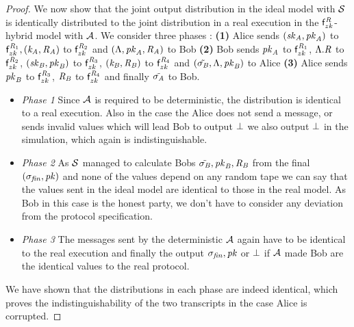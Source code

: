 \begin{proof}
    We now show that the joint output distribution in the ideal model with $\mathcal{S}$ is identically distributed to the joint distribution in a real execution in the $\mathsf{f}^{\mathit{R}}_{zk}$-hybrid model with $\mathcal{A}$.
    We consider three phases :
    \textbf{(1)} Alice sends $(\mathit{sk}_{\mathit{A}}, \mathit{pk}_{\mathit{A}})$ to $\mathsf{f}^{\mathit{R}_1}_{zk}, (\mathit{\mathit{k}_{\mathit{A}}}, \mathit{R}_{\mathit{A}})$ to $\mathsf{f}^{\mathit{R}_2}_{zk}$ and $(\Lambda, \mathit{pk}_{\mathit{A}}, \mathit{R}_{\mathit{A}})$ to Bob
    \textbf{(2)} Bob sends $\mathit{pk}_{\mathit{A}}$ to $\mathsf{f}^{\mathit{R}_1}_{zk}$, $\Lambda.\mathit{R}$ to $\mathsf{f}^{\mathit{R}_2}_{zk}$, $(\mathit{sk}_{\mathit{B}}, \mathit{pk}_{\mathit{B}})$ to $\mathsf{f}^{\mathit{R}_3}_{zk}$, $(\mathit{\mathit{k}_{\mathit{B}}}, \mathit{R}_{\mathit{B}})$ to $\mathsf{f}^{\mathit{R}_4}_{zk}$ and $(\tilde{\sigma_{\mathit{B}}}, \Lambda, \mathit{pk}_{\mathit{B}})$ to Alice
    \textbf{(3)} Alice sends $\mathit{pk}_{\mathit{B}}$ to $\mathsf{f}^{\mathit{R}_3}_{zk}$, $\mathit{R}_{\mathit{B}}$ to $\mathsf{f}^{\mathit{R}_4}_{zk}$ and finally $\tilde{\sigma_{\mathit{A}}}$ to Bob.

    \begin{itemize}
        \item \textit{Phase 1} Since $\mathcal{A}$ is required to be deterministic, the distribution is identical to a real execution.
        Also in the case the Alice does not send a message, or sends invalid values which will lead Bob to output $\bot$ we also output $\bot$ in the simulation, which again is indistinguishable.
        \item \textit{Phase 2} As $\mathcal{S}$ managed to calculate Bobs $\tilde{\sigma_{\mathit{B}}}, \mathit{pk}_{\mathit{B}}, \mathit{R}_{\mathit{B}}$ from the final $(\sigma_{\mathit{fin}}, \mathit{pk})$ and none of the values depend on any random tape we can say that the values sent in the ideal model are identical to those in the real model.
        As Bob in this case is the honest party, we don't have to consider any deviation from the protocol specification.
        \item \textit{Phase 3} The messages sent by the deterministic $\mathcal{A}$ again have to be identical to the real execution and finally the output $\sigma_{\mathit{fin}}, \mathit{pk}$ or $\bot$ if $\mathcal{A}$ made Bob are the identical values to the real protocol.
    \end{itemize}

    We have shown that the distributions in each phase are indeed identical, which proves the indistinguishability of the two transcripts in the case Alice is corrupted.


\end{proof}
